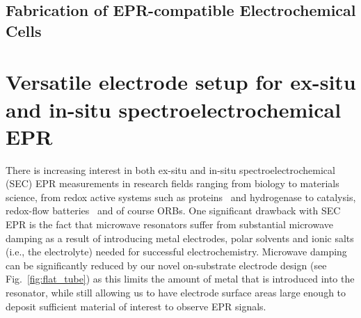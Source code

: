 \subsection{Fabrication of EPR-compatible Electrochemical Cells}

\section{Versatile electrode setup for ex-situ and in-situ spectroelectrochemical EPR}\label{electrode_setup}
%
There is increasing interest in both ex-situ and in-situ spectroelectrochemical (SEC) EPR measurements in research fields ranging from biology to materials science, from redox active systems such as proteins~\cite{abdiaziz2019_chemcomm} and hydrogenase to catalysis,\cite{kutin2019_catalysis, neukermans2020_chemelectrochem, bonke2021_natrev, priebe2013_angewandte, rabeah2015_angewandte} redox-flow batteries~\cite{zhao2021_jacs} and of course ORBs.\cite{huang2016_jpowersources, kanzaki2018_acsappmat} One significant drawback with SEC EPR is the fact that microwave resonators suffer from substantial microwave damping as a result of introducing metal electrodes, polar solvents and ionic salts (i.e., the electrolyte) needed for successful electrochemistry.\cite{wadhawan2007_encofelectrochem} Microwave damping can be significantly reduced by our novel on-substrate electrode design (see Fig.~\ref{fig:flat_tube}) as this limits the amount of metal that is introduced into the resonator, while still allowing us to have electrode surface areas large enough to deposit sufficient material of interest to observe EPR signals.

